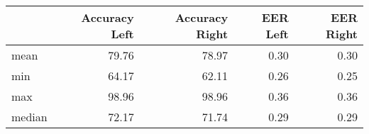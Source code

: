 \begin{tabular}{lrrrr}
\toprule
{} &  Accuracy Left &  Accuracy Right &  EER Left &  EER Right \\
\midrule
mean   &          79.76 &           78.97 &      0.30 &       0.30 \\
min    &          64.17 &           62.11 &      0.26 &       0.25 \\
max    &          98.96 &           98.96 &      0.36 &       0.36 \\
median &          72.17 &           71.74 &      0.29 &       0.29 \\
\bottomrule
\end{tabular}
